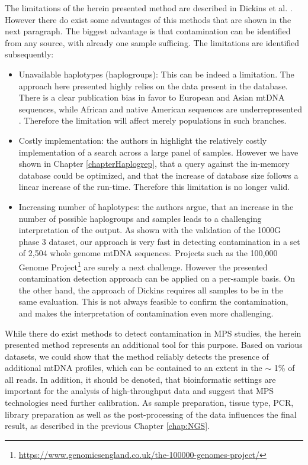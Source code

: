 The limitations of the herein presented method are described in Dickins et al. \cite{Dickins2014}. However there do exist some advantages of this methods that are shown in the next paragraph. The biggest advantage is that contamination can be identified from any source, with already one sample sufficing. The limitations are identified subsequently:
\begin{itemize}
\item Unavailable haplotypes (haplogroups): This can be indeed a limitation. The approach here presented highly relies on the data present in the database. There is a clear publication bias in favor to European and Asian mtDNA sequences, while African and native American sequences are underrepresented \cite{Fendt2011}. Therefore the limitation will affect merely populations in such branches. 
\item Costly implementation: the authors in \cite{Dickins2014} highlight the relatively costly implementation of a search across a large panel of samples. However we have shown in Chapter \ref{chapterHaplogrep}, that a query against the in-memory database could be optimized, and that the increase of database size follows a linear increase of the run-time. Therefore this limitation is no longer valid.
\item Increasing number of haplotypes: the authors argue, that an increase in the number of possible haplogroups and samples leads to a challenging interpretation of the output. As shown with the validation of the 1000G phase 3 dataset, our approach is very fast in detecting contamination in a set of 2,504 whole genome mtDNA sequences. Projects such as the 100,000 Genome Project\footnote{\url{https://www.genomicsengland.co.uk/the-100000-genomes-project/}} are surely a next challenge. However the presented  contamination detection approach can be applied on a per-sample basis. On the other hand, the approach of Dickins requires all samples to be in the same evaluation. This is not always feasible to confirm the contamination, and makes the interpretation of contamination even more challenging. 
\end{itemize}

While there do exist methods to detect contamination in MPS studies, the herein presented method represents an additional tool for this purpose. Based on various datasets, we could show that the method reliably detects the presence of additional mtDNA profiles, which can be contained to an extent in the $\sim$ 1\% of all reads. 
In addition, it should be denoted, that bioinformatic settings are important for the analysis of high-throughput data and suggest that MPS technologies need further calibration. As sample preparation, tissue type, PCR, library preparation as well as the post-processing of the data influences the final result, as described in the previous Chapter \ref{chap:NGS}.

